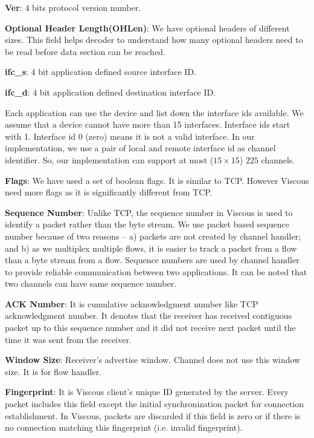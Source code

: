 \noindent \textbf{Ver}: $4$ bits protocol version number. 
    
\noindent  \textbf{Optional Header Length(OHLen)}: We have optional headers of different sizes. This field helps decoder to understand how many optional headers need to be read before data section can be reached.
    
\noindent \textbf{ifc\_s}: 4 bit application defined source interface ID.
 
\noindent  \textbf{ifc\_d}: 4 bit application defined destination interface ID.

\hspace{3pt} Each application can use the device and list down the interface ids available. We assume that a device cannot have more than 15 interfaces. Interface ids start with 1. Interface id $0$ (zero) means it is not a valid interface. In our implementation, we use a pair of local and remote interface id as channel identifier. So, our implementation can support at most ($15\times15$) $225$ channels.
    
\noindent  \textbf{Flags}: We have used a set of boolean flags. It is similar to TCP. However Viscous need more flags as it is significantly different from TCP.
    
\noindent  \textbf{Sequence Number}:  Unlike TCP, the sequence number in Viscous is used to identify a packet rather than the byte stream. We use packet based sequence number because of two reasons -- a) packets are not created by channel handler; and b) as we multiplex multiple flows, it is easier to track a packet from a flow than a byte stream from a flow. Sequence numbers are used by channel handler to provide reliable communication between two applications. It can be noted that two channels can have same sequence number.
    
\noindent  \textbf{ACK Number}: It is cumulative acknowledgment number like TCP acknowledgment number. It denotes that the receiver has received contiguous packet up to this sequence number and it did not receive next packet until the time it was sent from the receiver.
    
\noindent \textbf{Window Size}: Receiver's advertise window. Channel does not use this window size. It is for flow handler.
    
\noindent  \textbf{Fingerprint}: It is Viscous client's unique ID generated by the server. Every packet includes this field except the initial synchronization packet for connection establishment. In Viscous, packets are discarded if this field is zero or if there is no connection matching this fingerprint (i.e. invalid fingerprint).
    
